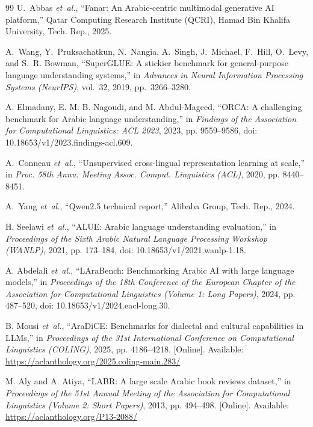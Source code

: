 \begin{thebibliography}{99}
U.~Abbas \emph{et~al.}, ``Fanar: An Arabic-centric multimodal generative AI platform,'' Qatar Computing Research Institute (QCRI), Hamad Bin Khalifa University, Tech. Rep., 2025.

A.~Wang, Y.~Pruksachatkun, N.~Nangia, A.~Singh, J.~Michael, F.~Hill, O.~Levy, and S.~R. Bowman, ``SuperGLUE: A stickier benchmark for general-purpose language understanding systems,'' in \emph{Advances in Neural Information Processing Systems (NeurIPS)}, vol.~32, 2019, pp.~3266--3280.

A. Elmadany, E. M. B. Nagoudi, and M. Abdul-Mageed, ``{ORCA}: A challenging benchmark for {A}rabic language understanding,'' in \emph{Findings of the Association for Computational Linguistics: ACL 2023}, 2023, pp. 9559--9586, doi: 10.18653/v1/2023.findings-acl.609.

A.~Conneau \emph{et~al.}, ``Unsupervised cross-lingual representation learning at scale,'' in \emph{Proc. 58th Annu. Meeting Assoc. Comput. Linguistics (ACL)}, 2020, pp. 8440--8451.

A.~Yang \emph{et~al.}, ``Qwen2.5 technical report,'' Alibaba Group, Tech. Rep., 2024.

H. Seelawi \emph{et~al.}, ``{ALUE}: {A}rabic language understanding evaluation,'' in \emph{Proceedings of the Sixth Arabic Natural Language Processing Workshop (WANLP)}, 2021, pp. 173--184, doi: 10.18653/v1/2021.wanlp-1.18.

A. Abdelali \emph{et~al.}, ``{LAraBench}: Benchmarking {A}rabic {AI} with large language models,'' in \emph{Proceedings of the 18th Conference of the European Chapter of the Association for Computational Linguistics (Volume 1: Long Papers)}, 2024, pp. 487--520, doi: 10.18653/v1/2024.eacl-long.30.

B. Mousi \emph{et~al.}, ``{AraDiCE}: Benchmarks for dialectal and cultural capabilities in {LLM}s,'' in \emph{Proceedings of the 31st International Conference on Computational Linguistics (COLING)}, 2025, pp. 4186--4218. [Online]. Available: \url{https://aclanthology.org/2025.coling-main.283/}

M. Aly and A. Atiya, ``{LABR}: A large scale {A}rabic book reviews dataset,'' in \emph{Proceedings of the 51st Annual Meeting of the Association for Computational Linguistics (Volume 2: Short Papers)}, 2013, pp. 494--498. [Online]. Available: \url{https://aclanthology.org/P13-2088/}


\end{thebibliography}
